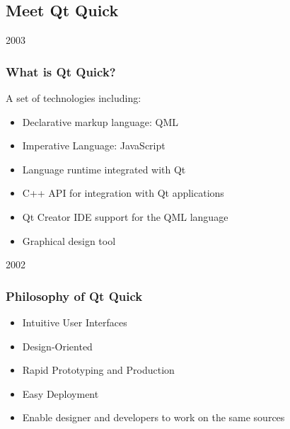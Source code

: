 %
%
%
%

\subsection{Meet Qt Quick}

\begin{slide}{2003}\frametitle{What is Qt Quick?}
\vspace*{1.5em}

A set of technologies including:
\begin{itemize}
\item Declarative markup language: QML
\item Imperative Language: JavaScript
\item Language runtime integrated with Qt
\item C++ API for integration with Qt applications
\item Qt Creator IDE support for the QML language
\item Graphical design tool
\end{itemize}
\end{slide}

\begin{slide}{2002}\frametitle{Philosophy of Qt Quick}
\vspace*{1.5em}

\begin{itemize}
\item Intuitive User Interfaces
\item Design-Oriented
\item Rapid Prototyping and Production
\item Easy Deployment
\item Enable designer and developers to work on the same sources
\end{itemize}
\end{slide}

